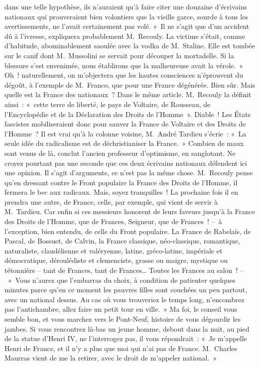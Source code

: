 \documentclass[french,twoside]{book} %
\begin{document}
dans une telle hypothèse, ils n’auraient qu’à faire citer une douzaine d’écrivains nationaux qui prouveraient bien volontiers que la vieille garce, sourde à tous les avertissements, ne l’avait certainement pas volé. « Il ne s’agit que d’un accident dû à l’ivresse, expliquera probablement M. Recouly. La victime s’était, comme d’habitude, abominablement saoulée avec la vodka de M. Staline. Elle est tombée sur le canif dont M. Mussolini se servait pour découper la mortadelle. Si la blessure s’est envenimée, nous établirons que la malheureuse avait la vérole. » Oh ! naturellement, on m’objectera que les hautes consciences n’éprouvent du dégoût, à l’exemple de M. Franco, que pour une France dégénérée. Bien sûr. Mais quelle est la France des nationaux ? Dans le même article. M. Recouly la définit ainsi : « cette terre de liberté, le pays de Voltaire, de Rousseau, de l’Encyclopédie et de la Déclaration des Droits de l’Homme ». Diable ! Les États fascistes mobiliseraient donc pour sauver la France de Voltaire et des Droits de l’Homme ? Il est vrai qu’à la colonne voisine, M. André Tardieu s’écrie : « La seule idée du radicalisme est de déchristianiser la France. » Combien de maux sont venus de là, conclut l’ancien professeur d’optimisme, en sanglotant. Ne croyez pourtant pas une seconde que ces deux écrivains nationaux défendent ici une opinion. Il s’agit d’arguments, ce n’est pas la même chose. M. Recouly pense qu’en dressant contre le Front populaire la France des Droits de l’Homme, il fermera le bec aux radicaux. Mais, soyez tranquilles ! La prochaine fois il en prendra une autre, de France, celle, par exemple, qui vient de servir à M. Tardieu. Car enfin si ces messieurs honorent de leurs faveurs jusqu’à la France des Droits de l’Homme, que de Frances, Seigneur, que de Frances ! – à l’exception, bien entendu, de celle du Front populaire. La France de Rabelais, de Pascal, de Bossuet, de Calvin, la France classique, néo-classique, romantique, naturaliste, claudélienne et valéryenne, latine, gréco-latine, impériale et démocratique, déroulédiste et clemenciste, grasse ou maigre, mystique ou tétonnière – tant de Frances, tant de Frances… Toutes les Frances au salon ! – « Vous n’aurez que l’embarras du choix, à condition de patienter quelques minutes parce qu’en ce moment les pauvres filles sont couchées un peu partout, avec un national dessus. Au cas où vous trouveriez le temps long, n’encombrez pas l’antichambre, allez faire un petit tour en ville. » Ma foi, le conseil vous semble bon, et vous marchez vers le Pont-Neuf, histoire de vous dégourdir les jambes. Si vous rencontrez là-bas un jeune homme, debout dans la nuit, au pied de la statue d’Henri \textsc{IV}, ne l’interrogez pas, il vous répondrait : « Je m’appelle Henri de France, et il n’y a plus que moi qui n’ai pas de France. M. Charles Maurras vient de me la retirer, avec le droit de m’appeler national. »
\end{document}
